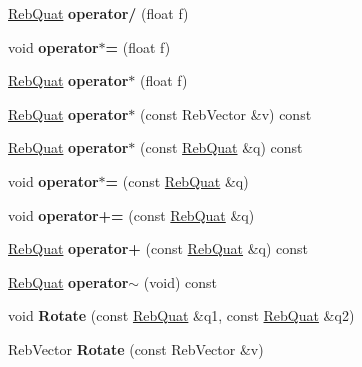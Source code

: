 \begin{DoxyCompactItemize}
\item 
\hyperlink{class_reb_quat}{Reb\+Quat} {\bfseries operator/} (float f)\hypertarget{class_reb_quat_a75ef32df94512603ba824eff17401107}{}\label{class_reb_quat_a75ef32df94512603ba824eff17401107}

\item 
void {\bfseries operator$\ast$=} (float f)\hypertarget{class_reb_quat_aed0b1562cc057693b8a023bae2936be1}{}\label{class_reb_quat_aed0b1562cc057693b8a023bae2936be1}

\item 
\hyperlink{class_reb_quat}{Reb\+Quat} {\bfseries operator$\ast$} (float f)\hypertarget{class_reb_quat_a211c6efa1d573bcfaf3706553e4b2c23}{}\label{class_reb_quat_a211c6efa1d573bcfaf3706553e4b2c23}

\item 
\hyperlink{class_reb_quat}{Reb\+Quat} {\bfseries operator$\ast$} (const Reb\+Vector \&v) const \hypertarget{class_reb_quat_a62169cf5d30053b4defda82d29f06585}{}\label{class_reb_quat_a62169cf5d30053b4defda82d29f06585}

\item 
\hyperlink{class_reb_quat}{Reb\+Quat} {\bfseries operator$\ast$} (const \hyperlink{class_reb_quat}{Reb\+Quat} \&q) const \hypertarget{class_reb_quat_aaa1334f8752b983f3abd3e00f5cc51d0}{}\label{class_reb_quat_aaa1334f8752b983f3abd3e00f5cc51d0}

\item 
void {\bfseries operator$\ast$=} (const \hyperlink{class_reb_quat}{Reb\+Quat} \&q)\hypertarget{class_reb_quat_aa008098db486b5def4679d664bbbfa23}{}\label{class_reb_quat_aa008098db486b5def4679d664bbbfa23}

\item 
void {\bfseries operator+=} (const \hyperlink{class_reb_quat}{Reb\+Quat} \&q)\hypertarget{class_reb_quat_a903c9aeb0cc0671df6cb53e9e339d864}{}\label{class_reb_quat_a903c9aeb0cc0671df6cb53e9e339d864}

\item 
\hyperlink{class_reb_quat}{Reb\+Quat} {\bfseries operator+} (const \hyperlink{class_reb_quat}{Reb\+Quat} \&q) const \hypertarget{class_reb_quat_a017b214441c6116220af628a565132dd}{}\label{class_reb_quat_a017b214441c6116220af628a565132dd}

\item 
\hyperlink{class_reb_quat}{Reb\+Quat} {\bfseries operator$\sim$} (void) const \hypertarget{class_reb_quat_a94487ce8182a16a526f4fcea4042894b}{}\label{class_reb_quat_a94487ce8182a16a526f4fcea4042894b}

\item 
void {\bfseries Rotate} (const \hyperlink{class_reb_quat}{Reb\+Quat} \&q1, const \hyperlink{class_reb_quat}{Reb\+Quat} \&q2)\hypertarget{class_reb_quat_a97184a4be87ad7f920c9350bc8a94dfb}{}\label{class_reb_quat_a97184a4be87ad7f920c9350bc8a94dfb}

\item 
Reb\+Vector {\bfseries Rotate} (const Reb\+Vector \&v)\hypertarget{class_reb_quat_a10ee15c85bfb1c485179d802d2da1d59}{}\label{class_reb_quat_a10ee15c85bfb1c485179d802d2da1d59}

\end{DoxyCompactItemize}
